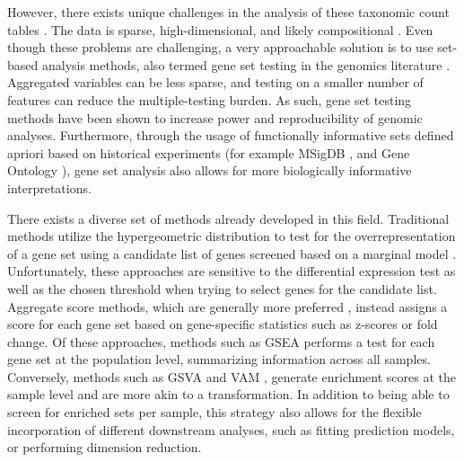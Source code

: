 \documentclass[10pt,letterpaper]{article}
\begin{document}
However, there exists unique challenges in the analysis of these taxonomic count tables \cite{li2019a,li2015}. The data is sparse, high-dimensional, and likely compositional \cite{gloor2017, li2019a, li2015}. Even though these problems are challenging, a very approachable solution is to use set-based analysis methods, also termed gene set testing in the genomics literature \cite{khatri2012, goeman2007}. Aggregated variables can be less sparse, and testing on a smaller number of features can reduce the multiple-testing burden. As such, gene set testing methods have been shown to increase power and reproducibility of genomic analyses. Furthermore, through the usage of functionally informative sets defined apriori based on historical experiments (for example MSigDB \cite{subramanian2005}, and Gene Ontology \cite{ashburner2000}), gene set analysis also allows for more biologically informative interpretations. 

There exists a diverse set of methods already developed in this field. Traditional methods utilize the hypergeometric distribution to test for the overrepresentation of a gene set using a candidate list of genes screened based on a marginal model \cite{goeman2007}. Unfortunately, these approaches are sensitive to the differential expression test as well as the chosen threshold when trying to select genes for the candidate list. Aggregate score methods, which are generally more preferred \cite{irizarry2009}, instead assigns a score for each gene set based on gene-specific statistics such as z-scores or fold change. Of these approaches, methods such as GSEA \cite{subramanian2005} performs a test for each gene set at the population level, summarizing information across all samples. Conversely, methods such as GSVA \cite{hanzelmann2013} and VAM \cite{frost2020}, generate enrichment scores at the sample level and are more akin to a transformation. In addition to being able to screen for enriched sets per sample, this strategy also allows for the flexible incorporation of different downstream analyses, such as fitting prediction models, or performing dimension reduction.  

\end{document}
